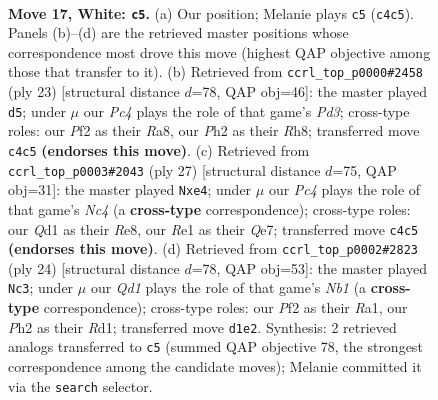 \documentclass[11pt]{article}
\begin{document}
\clearpage

\begin{figure}[p]\centering
\begin{subfigure}{0.46\textwidth}\centering
\resizebox{\linewidth}{!}{%
\newchessgame
\chessboard[
  setfen={r1bqr1k1/pp3ppp/1n1bp3/4n3/2Pp2P1/1P4KB/P2P1P1P/RNBQR3 w - - 2 17},
  showmover=false,
  pgfstyle=straightmove, color=movearrow, markmove={c4-c5}
]}
\caption{}
\end{subfigure}\hfill
\begin{subfigure}{0.46\textwidth}\centering
\resizebox{\linewidth}{!}{%
\newchessgame
\chessboard[
  setfen={r3kb1r/1pq2pp1/p1npb2p/4p3/P1N1N3/8/1PP1BPPP/R1BQ1RK1 b kq - 0 12},
  showmover=false,
  pgfstyle=straightmove, color=movearrow, markmove={d6-d5}
]}
\caption{}
\end{subfigure}
\\[4pt]
\begin{subfigure}{0.46\textwidth}\centering
\resizebox{\linewidth}{!}{%
\newchessgame
\chessboard[
  setfen={r1b1r1k1/pp2qpbp/2pp2p1/2n5/2PNN3/4B1PP/PPQ2PB1/R3R1K1 b - - 0 14},
  showmover=false,
  pgfstyle=straightmove, color=movearrow, markmove={c5-e4}
]}
\caption{}
\end{subfigure}\hfill
\begin{subfigure}{0.46\textwidth}\centering
\resizebox{\linewidth}{!}{%
\newchessgame
\chessboard[
  setfen={r1bqr1k1/pp3ppp/2pb1n2/2n5/3NP3/6P1/PPQ2PBP/RNBR2K1 w - - 3 13},
  showmover=false,
  pgfstyle=straightmove, color=movearrow, markmove={b1-c3}
]}
\caption{}
\end{subfigure}
\caption{\textbf{Move 17, White: \texttt{c5}.} (a) Our position; Melanie plays \texttt{c5} (\texttt{c4c5}). Panels (b)--(d) are the retrieved master positions whose correspondence most drove this move (highest QAP objective among those that transfer to it). (b) Retrieved from \texttt{ccrl\_top\_p0000\#2458} (ply 23) [structural distance $d$=78, QAP obj=46]: the master played \texttt{d5}; under $\mu$ our \emph{Pc4} plays the role of that game's \emph{Pd3}; cross-type roles: our \emph{P}f2 as their \emph{R}a8, our \emph{P}h2 as their \emph{R}h8; transferred move \texttt{c4c5} \textbf{(endorses this move)}. (c) Retrieved from \texttt{ccrl\_top\_p0003\#2043} (ply 27) [structural distance $d$=75, QAP obj=31]: the master played \texttt{Nxe4}; under $\mu$ our \emph{Pc4} plays the role of that game's \emph{Nc4} (a \textbf{cross-type} correspondence); cross-type roles: our \emph{Q}d1 as their \emph{R}e8, our \emph{R}e1 as their \emph{Q}e7; transferred move \texttt{c4c5} \textbf{(endorses this move)}. (d) Retrieved from \texttt{ccrl\_top\_p0002\#2823} (ply 24) [structural distance $d$=78, QAP obj=53]: the master played \texttt{Nc3}; under $\mu$ our \emph{Qd1} plays the role of that game's \emph{Nb1} (a \textbf{cross-type} correspondence); cross-type roles: our \emph{P}f2 as their \emph{R}a1, our \emph{P}h2 as their \emph{R}d1; transferred move \texttt{d1e2}. Synthesis: 2 retrieved analogs transferred to \texttt{c5} (summed QAP objective 78, the strongest correspondence among the candidate moves); Melanie committed it via the \texttt{search} selector.}
\label{fig:thought-m32}
\end{figure}
\end{document}

